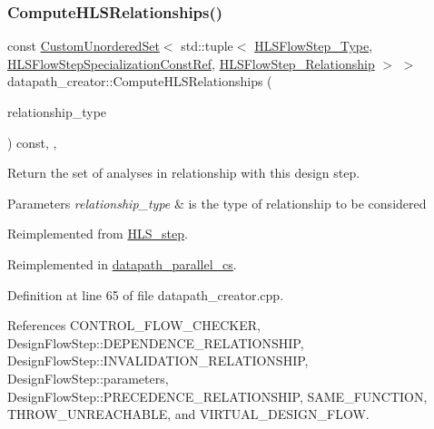 \subsubsection{\texorpdfstring{Compute\+H\+L\+S\+Relationships()}{ComputeHLSRelationships()}}
{\footnotesize\ttfamily const \hyperlink{classCustomUnorderedSet}{Custom\+Unordered\+Set}$<$ std\+::tuple$<$ \hyperlink{hls__step_8hpp_ada16bc22905016180e26fc7e39537f8d}{H\+L\+S\+Flow\+Step\+\_\+\+Type}, \hyperlink{hls__step_8hpp_a5fdd2edf290c196531d21d68e13f0e74}{H\+L\+S\+Flow\+Step\+Specialization\+Const\+Ref}, \hyperlink{hls__step_8hpp_a3ad360b9b11e6bf0683d5562a0ceb169}{H\+L\+S\+Flow\+Step\+\_\+\+Relationship} $>$ $>$ datapath\+\_\+creator\+::\+Compute\+H\+L\+S\+Relationships (\begin{DoxyParamCaption}\item[{const \hyperlink{classDesignFlowStep_a723a3baf19ff2ceb77bc13e099d0b1b7}{Design\+Flow\+Step\+::\+Relationship\+Type}}]{relationship\+\_\+type }\end{DoxyParamCaption}) const\hspace{0.3cm}{\ttfamily [override]}, {\ttfamily [protected]}, {\ttfamily [virtual]}}



Return the set of analyses in relationship with this design step. 


\begin{DoxyParams}{Parameters}
{\em relationship\+\_\+type} & is the type of relationship to be considered \\
\hline
\end{DoxyParams}


Reimplemented from \hyperlink{classHLS__step_aed0ce8cca9a1ef18e705fc1032ad4de5}{H\+L\+S\+\_\+step}.



Reimplemented in \hyperlink{classdatapath__parallel__cs_a8ddd2d2e3b0f6b9d6ee635cb4a52beb7}{datapath\+\_\+parallel\+\_\+cs}.



Definition at line 65 of file datapath\+\_\+creator.\+cpp.



References C\+O\+N\+T\+R\+O\+L\+\_\+\+F\+L\+O\+W\+\_\+\+C\+H\+E\+C\+K\+ER, Design\+Flow\+Step\+::\+D\+E\+P\+E\+N\+D\+E\+N\+C\+E\+\_\+\+R\+E\+L\+A\+T\+I\+O\+N\+S\+H\+IP, Design\+Flow\+Step\+::\+I\+N\+V\+A\+L\+I\+D\+A\+T\+I\+O\+N\+\_\+\+R\+E\+L\+A\+T\+I\+O\+N\+S\+H\+IP, Design\+Flow\+Step\+::parameters, Design\+Flow\+Step\+::\+P\+R\+E\+C\+E\+D\+E\+N\+C\+E\+\_\+\+R\+E\+L\+A\+T\+I\+O\+N\+S\+H\+IP, S\+A\+M\+E\+\_\+\+F\+U\+N\+C\+T\+I\+ON, T\+H\+R\+O\+W\+\_\+\+U\+N\+R\+E\+A\+C\+H\+A\+B\+LE, and V\+I\+R\+T\+U\+A\+L\+\_\+\+D\+E\+S\+I\+G\+N\+\_\+\+F\+L\+OW.



